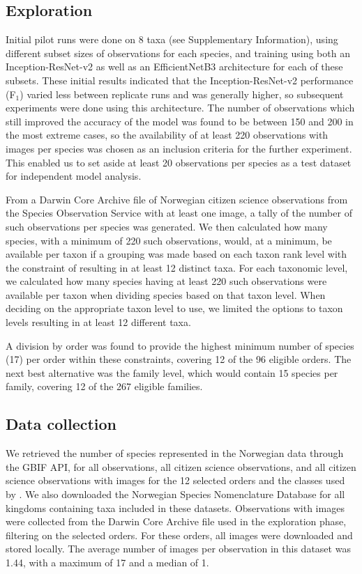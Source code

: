 \documentclass{article}
\begin{document}
\subsection*{Exploration}
Initial pilot runs were done on 8 taxa (see Supplementary Information), using different subset sizes of observations for each species, and training using both an Inception-ResNet-v2\autocite{szegedy2016inceptionv4} as well as an EfficientNetB3\autocite{tan2020efficientnet} architecture for each of these subsets. These initial results indicated that the Inception-ResNet-v2 performance (F\(_1\)) varied less between replicate runs and was generally higher, so subsequent experiments were done using this architecture. The number of observations which still improved the accuracy of the model was found to be between 150 and 200 in the most extreme cases, so the availability of at least 220 observations with images per species was chosen as an inclusion criteria for the further experiment. This enabled us to set aside at least 20 observations per species as a test dataset for independent model analysis.

From a Darwin Core Archive file of Norwegian citizen science observations from the Species Observation Service with at least one image\autocite{GBIF_dataset}, a tally of the number of such observations per species was generated. We then calculated how many species, with a minimum of 220 such observations, would, at a minimum, be available per taxon if a grouping was made based on each taxon rank level with the constraint of resulting in at least 12 distinct taxa. For each taxonomic level, we calculated how many species having at least 220 such observations were available per taxon when dividing species based on that taxon level. When deciding on the appropriate taxon level to use, we limited the options to taxon levels resulting in at least 12 different taxa.

A division by order was found to provide the highest minimum number of species (17) per order within these constraints, covering 12 of the 96 eligible orders. The next best alternative was the family level, which would contain 15 species per family, covering 12 of the 267 eligible families.

\subsection*{Data collection}
We retrieved the number of species represented in the Norwegian data through the GBIF API, for all observations, all citizen science observations, and all citizen science observations with images for the 12 selected orders and the classes used by \citeauthor{Troudet2017}\autocite{Troudet2017}. We also downloaded the Norwegian Species Nomenclature Database\autocite{Artsnavnebase} for all kingdoms containing taxa included in these datasets. Observations with images were collected from the Darwin Core Archive file used in the exploration phase, filtering on the selected orders. For these orders, all images were downloaded and stored locally. The average number of images per observation in this dataset was 1.44, with a maximum of 17 and a median of 1.
\end{document}
